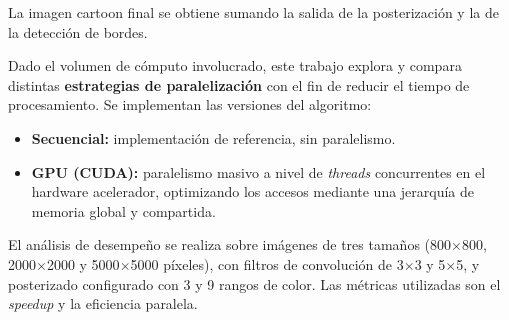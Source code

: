 La imagen cartoon final se obtiene sumando la salida de la posterización y la de la detección
de bordes.
 
Dado el volumen de cómputo involucrado, este trabajo explora y compara distintas \textbf{estrategias de
paralelización} con el fin de reducir el tiempo de procesamiento. Se implementan las versiones del algoritmo:
 
\begin{itemize}
  \item \textbf{Secuencial:} implementación de referencia, sin paralelismo.
  \item \textbf{GPU (CUDA):} paralelismo masivo a nivel de \textit{threads} concurrentes en el hardware acelerador, optimizando los accesos mediante una jerarquía de memoria global y compartida.
\end{itemize}
 
El análisis de desempeño se realiza sobre imágenes de tres tamaños
(800$\times$800, 2000$\times$2000 y 5000$\times$5000 píxeles), con filtros de convolución
de 3$\times$3 y 5$\times$5, y posterizado configurado con 3 y 9 rangos de color. Las métricas
utilizadas son el \textit{speedup} y la eficiencia paralela.